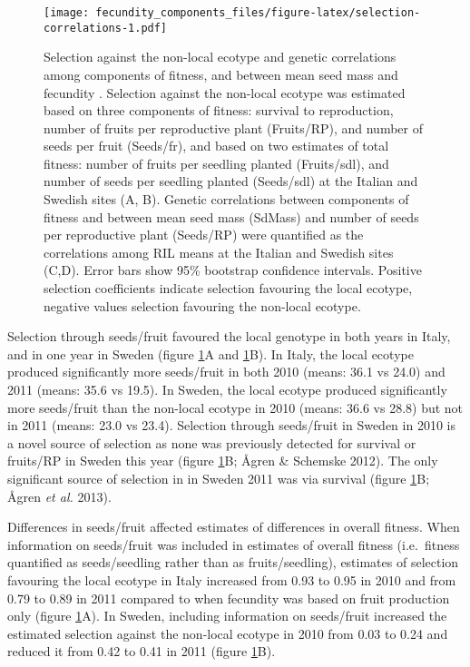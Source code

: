 \documentclass[]{article}
\begin{document}
\begin{figure}
\centering
\texttt{[image: fecundity\_components\_files/figure-latex/selection-correlations-1.pdf]}
\caption{\label{fig:selection-correlations}Selection against the non-local ecotype and genetic correlations among components of fitness, and between mean seed mass and fecundity . Selection against the non-local ecotype was estimated based on three components of fitness: survival to reproduction, number of fruits per reproductive plant (Fruits/RP), and number of seeds per fruit (Seeds/fr), and based on two estimates of total fitness: number of fruits per seedling planted (Fruits/sdl), and number of seeds per seedling planted (Seeds/sdl) at the Italian and Swedish sites (A, B). Genetic correlations between components of fitness and between mean seed mass (SdMass) and number of seeds per reproductive plant (Seeds/RP) were quantified as the correlations among RIL means at the Italian and Swedish sites (C,D). Error bars show 95\% bootstrap confidence intervals. Positive selection coefficients indicate selection favouring the local ecotype, negative values selection favouring the non-local ecotype.}
\end{figure}

Selection through seeds/fruit favoured the local genotype in both years in Italy, and in one year in Sweden (figure \ref{fig:selection-correlations}A and \ref{fig:selection-correlations}B).
In Italy, the local ecotype produced significantly more seeds/fruit in both 2010
(means:
36.1
vs
24.0)
and 2011 (means:
35.6
vs
19.5).
In Sweden, the local ecotype produced significantly more seeds/fruit than the non-local ecotype in 2010 (means:
36.6
vs
28.8)
but not in 2011 (means:
23.0
vs
23.4).
Selection through seeds/fruit in Sweden in 2010 is a novel source of selection as none was previously detected for survival or fruits/RP in Sweden this year (figure \ref{fig:selection-correlations}B; Ågren \& Schemske 2012). The only significant source of selection in in Sweden 2011 was via survival (figure \ref{fig:selection-correlations}B; Ågren \emph{et al.} 2013).

Differences in seeds/fruit affected estimates of differences in overall fitness. When information on seeds/fruit was included in estimates of overall fitness (i.e.~fitness quantified as seeds/seedling rather than as fruits/seedling), estimates of selection favouring the local ecotype in Italy increased from
0.93
to
0.95
in 2010 and from
0.79
to
0.89
in 2011 compared to when fecundity was based on fruit production only (figure \ref{fig:selection-correlations}A). In Sweden, including information on seeds/fruit increased the estimated selection against the non-local ecotype in 2010 from
0.03
to
0.24
and reduced it from
0.42
to
0.41
in 2011 (figure \ref{fig:selection-correlations}B).
\end{document}
